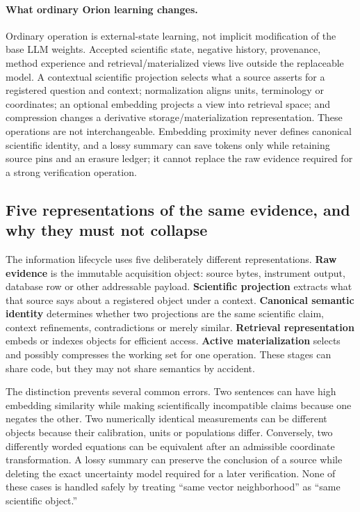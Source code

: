 \paragraph{What ordinary Orion learning changes.}
Ordinary \RAKL{} operation is external-state learning, not implicit modification of the base LLM weights. Accepted scientific state, negative history, provenance, method experience and retrieval/materialized views live outside the replaceable model. A contextual scientific projection selects what a source asserts for a registered question and context; normalization aligns units, terminology or coordinates; an optional embedding projects a view into retrieval space; and compression changes a derivative storage/materialization representation. These operations are not interchangeable. Embedding proximity never defines canonical scientific identity, and a lossy summary can save tokens only while retaining source pins and an erasure ledger; it cannot replace the raw evidence required for a strong verification operation.

\subsection{Five representations of the same evidence, and why they must not collapse}

The information lifecycle uses five deliberately different representations. \textbf{Raw evidence} is the immutable acquisition object: source bytes, instrument output, database row or other addressable payload. \textbf{Scientific projection} extracts what that source says about a registered object under a context. \textbf{Canonical semantic identity} determines whether two projections are the same scientific claim, context refinements, contradictions or merely similar. \textbf{Retrieval representation} embeds or indexes objects for efficient access. \textbf{Active materialization} selects and possibly compresses the working set for one operation. These stages can share code, but they may not share semantics by accident.

The distinction prevents several common errors. Two sentences can have high embedding similarity while making scientifically incompatible claims because one negates the other. Two numerically identical measurements can be different objects because their calibration, units or populations differ. Conversely, two differently worded equations can be equivalent after an admissible coordinate transformation. A lossy summary can preserve the conclusion of a source while deleting the exact uncertainty model required for a later verification. None of these cases is handled safely by treating ``same vector neighborhood'' as ``same scientific object.''

